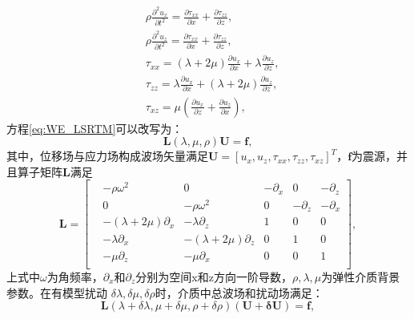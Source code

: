 \begin{equation}
\begin{split}
   & \rho\frac{\partial^2 u_{x}}{\partial t^2}=	\frac{\partial \tau_{xx}}{\partial x}+
		\frac{\partial \tau_{zz}}{\partial z},\\
   & \rho\frac{\partial^2 u_{z}}{\partial t^2}=	\frac{\partial \tau_{xx}}{\partial x}+
		\frac{\partial \tau_{zz}}{\partial z},\\
   & \tau_{xx}=(\lambda+2\mu)\frac{\partial u_x}{\partial x}+\lambda\frac{\partial u_z}{\partial z},\\
   & \tau_{zz}=\lambda\frac{\partial u_x}{\partial x}+(\lambda+2\mu)\frac{\partial u_z}{\partial z},\\
   & \tau_{xz}=\mu(\frac{\partial u_x}{\partial z} + \frac{\partial u_z}{\partial x}),
    \label{eq:WE_LSRTM}
\end{split}
\end{equation}
方程\eqref{eq:WE_LSRTM}可以改写为：
\begin{equation}
\mathbf{L}(\lambda,\mu,\rho)\mathbf{U}=\mathbf{f},
    \label{eq:WE_Matrix} 
\end{equation}
其中，位移场与应力场构成波场矢量满足$\mathbf{U}=[u_x,u_z,\tau_{xx},\tau_{zz},\tau_{xz}]^T$，$\mathbf{f}$为震源，并且算子矩阵$\mathbf{L}$满足
\begin{equation}
        \mathbf{L}
        =
        \begin{bmatrix}
			&-\rho\omega^2 &0 &-\partial_x & 0 &-\partial_z\\
			& 0  &-\rho\omega^2 &0 &-\partial_z &-\partial_x\\
			&-(\lambda+2\mu)\partial_x &-\lambda\partial_z &1 &0&0\\
			& -\lambda\partial_x  &-(\lambda+2\mu)\partial_z &0 &1&0\\
			& -\mu\partial_z  &-\mu\partial_x &0 &0&1\\
        \end{bmatrix},
        \label{eq:L}
\end{equation}
上式中$\omega$为角频率，$\partial_x$和$\partial_z$分别为空间x和z方向一阶导数，$\rho,\lambda,\mu$为弹性介质背景参数。在有模型扰动
$\delta\lambda,\delta\mu,\delta\rho$时，介质中总波场和扰动场满足：
\begin{equation}
\mathbf{L}(\lambda+\delta\lambda,\mu+\delta\mu,\rho+\delta\rho)(\mathbf{U+\delta U})=\mathbf{f},
    \label{eq:WE_Matrix_all} 
\end{equation}

